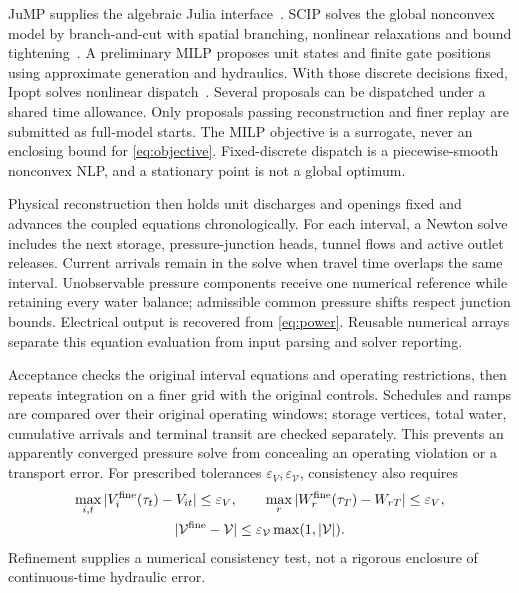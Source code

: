 \documentclass[10pt,a4paper]{article}
\begin{document}
JuMP supplies the algebraic Julia interface~\cite{jump}. SCIP solves the
global nonconvex model by branch-and-cut with spatial branching, nonlinear
relaxations and bound tightening~\cite{scip}. A preliminary MILP proposes
unit states and finite gate positions using approximate generation and
hydraulics. With those discrete decisions fixed, Ipopt solves nonlinear
dispatch~\cite{ipopt}. Several proposals can be dispatched under a shared
time allowance. Only proposals passing reconstruction and finer replay
are submitted as full-model starts.
The MILP objective is a surrogate, never an enclosing bound for
\eqref{eq:objective}. Fixed-discrete dispatch is a piecewise-smooth
nonconvex NLP, and a stationary point is not a global optimum.

Physical reconstruction then holds unit discharges and openings fixed and
advances the coupled equations chronologically. For each interval, a
Newton solve includes the next storage, pressure-junction heads, tunnel
flows and active outlet releases. Current arrivals remain in the solve
when travel time overlaps the same interval. Unobservable pressure
components receive one numerical reference while retaining every water
balance; admissible common pressure shifts respect junction bounds.
Electrical output is recovered from \eqref{eq:power}. Reusable numerical
arrays separate this equation evaluation from input parsing and solver
reporting.

Acceptance checks the original interval equations and operating restrictions,
then repeats integration on a finer grid with the original controls.
Schedules and ramps are compared over their original operating windows;
storage vertices, total water, cumulative arrivals and terminal transit
are checked separately. This prevents an apparently converged pressure
solve from concealing an operating violation or a transport error.
For prescribed tolerances $\varepsilon_V,\varepsilon_{\mathcal V}$, consistency
also requires
\begin{equation}
\begin{gathered}
\max_{i,t}|V_i^{\rm fine}(\tau_t)-V_{it}|\le\varepsilon_V,\qquad
\max_r|W_r^{\rm fine}(\tau_T)-W_{rT}|\le\varepsilon_V,\\
|\mathcal V^{\rm fine}-\mathcal V|
\le\varepsilon_{\mathcal V}\max(1,|\mathcal V|).
\end{gathered}
\label{eq:replaycriteria}
\end{equation}
Refinement supplies a numerical consistency test, not a rigorous enclosure
of continuous-time hydraulic error.
\end{document}
